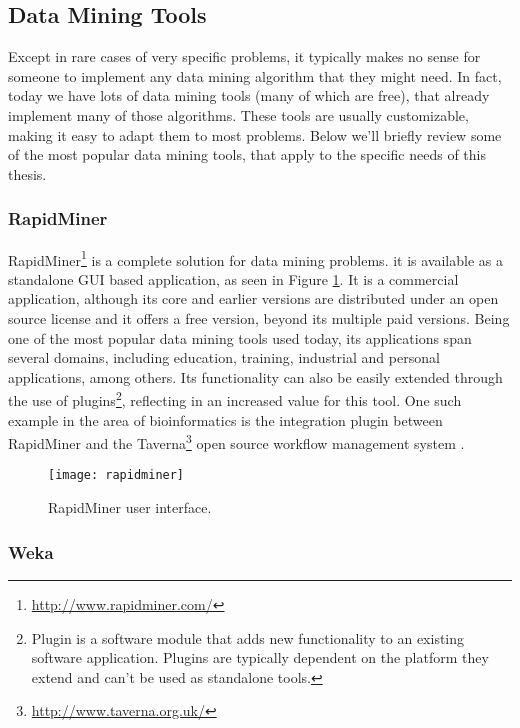 \subsection{Data Mining Tools}\label{sec:mintools}

Except in rare cases of very specific problems, it typically makes no sense for
someone to implement any data mining algorithm that they might need. In fact,
today we have lots of data mining tools (many of which are free), that already
implement many of those algorithms. These tools are usually customizable, making
it easy to adapt them to most problems. Below we'll briefly review some of the
most popular data mining tools, that apply to the specific needs of this thesis.

\subsubsection*{RapidMiner}

RapidMiner\footnote{\url{http://www.rapidminer.com/}} is a complete solution for
data mining problems. it is available as a standalone GUI based application, as
seen in Figure \ref{fig:rapidminer}. It is a commercial application, although
its core and earlier versions are distributed under an open source license and
it offers a free version, beyond its multiple paid versions. Being one of the
most popular data mining tools used today, its applications span several
domains, including education, training, industrial and personal applications,
among others. Its functionality can also be easily extended through the use of
plugins\footnote{Plugin is a software module that adds new functionality to an
existing software application. Plugins are typically dependent on the platform
they extend and can't be used as standalone tools.}, reflecting in an increased
value for this tool. One such example in the area of bioinformatics is the
integration plugin between RapidMiner and the
Taverna\footnote{\url{http://www.taverna.org.uk/}} open source workflow
management system \cite{Jupp2011}.

\begin{figure}[!htb]
  \begin{center}
    \leavevmode
    \texttt{[image: rapidminer]}
    \caption[RapidMiner user interface]{RapidMiner user interface.}
    \label{fig:rapidminer}
  \end{center}
\end{figure}

\subsubsection*{Weka}

